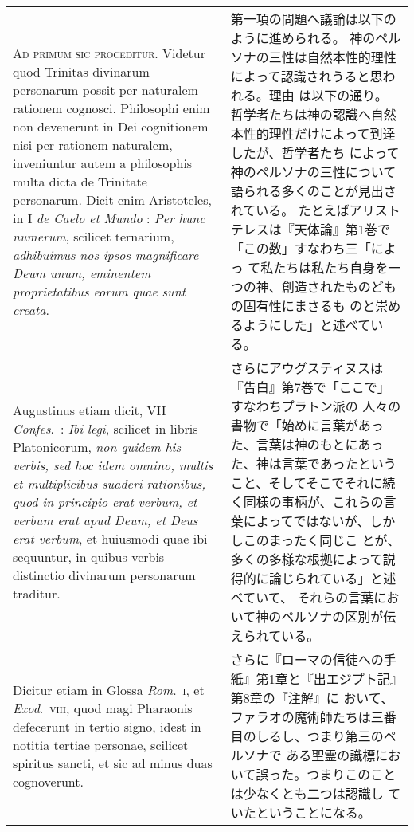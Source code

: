 \documentclass[10pt]{jsarticle} %
\begin{document}
\begin{longtable}{p{21em}p{21em}}

{\scshape Ad primum sic proceditur}. Videtur quod Trinitas divinarum personarum
possit per naturalem rationem cognosci. Philosophi enim non devenerunt
in Dei cognitionem nisi per rationem naturalem, inveniuntur autem a
philosophis multa dicta de Trinitate personarum. Dicit enim
Aristoteles, in I {\itshape de Caelo et Mundo} : {\itshape Per hunc numerum}, scilicet
ternarium, {\itshape adhibuimus nos ipsos magnificare Deum unum, eminentem
proprietatibus eorum quae sunt creata}. 


&

第一項の問題へ議論は以下のように進められる。
神のペルソナの三性は自然本性的理性によって認識されうると思われる。理由
 は以下の通り。
哲学者たちは神の認識へ自然本性的理性だけによって到達したが、哲学者たち
 によって神のペルソナの三性について語られる多くのことが見出されている。
 たとえばアリストテレスは『天体論』第1巻で「この数」すなわち三「によっ
 て私たちは私たち自身を一つの神、創造されたものどもの固有性にまさるも
 のと崇めるようにした」と述べている。

\\


Augustinus etiam dicit, VII
{\itshape Confes}.~: {\itshape Ibi legi}, scilicet in libris Platonicorum, {\itshape non quidem his
verbis, sed hoc idem omnino, multis et multiplicibus suaderi
rationibus, quod in principio erat verbum, et verbum erat apud Deum,
et Deus erat verbum}, et huiusmodi quae ibi sequuntur, in quibus verbis
distinctio divinarum personarum traditur. 


&

さらにアウグスティヌスは『告白』第7巻で「ここで」すなわちプラトン派の
 人々の書物で「始めに言葉があった、言葉は神のもとにあっ
 た、神は言葉であったということ、そしてそこでそれに続く同様の事柄が、これらの言葉によってではないが、しかしこのまったく同じこ
 とが、多くの多様な根拠によって説得的に論じられている」と述べていて、
 それらの言葉において神のペルソナの区別が伝えられている。

\\


Dicitur etiam in Glossa
{\itshape Rom}.~{\scshape i}, et {\itshape Exod}.~{\scshape viii}, quod magi Pharaonis defecerunt in tertio signo,
idest in notitia tertiae personae, scilicet spiritus sancti, et sic ad
minus duas cognoverunt. 


&

さらに『ローマの信徒への手紙』第1章と『出エジプト記』第8章の『注解』に
 おいて、ファラオの魔術師たちは三番目のしるし、つまり第三のペルソナで
 ある聖霊の識標において誤った。つまりこのことは少なくとも二つは認識し
 ていたということになる。



\end{longtable}
\end{document}
